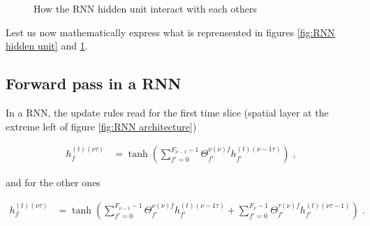 \begin{figure}[H]
\begin{center}
\caption{\label{fig:RNN interaction}How the RNN hidden unit interact with each others}
\end{center}
\end{figure}


Lest us now mathematically express what is reprensented in figures \ref{fig:RNN hidden unit} and \ref{fig:RNN interaction}.

\subsection{Forward pass in a RNN}

 In a RNN, the update rules read for the first time slice (spatial layer at the extreme left of figure \ref{fig:RNN architecture})
 
\begin{align}
h^{(t)(\nu\tau)}_f&=\tanh\left(\sum_{f'=0}^{F_{{\nu-1}}-1}\Theta^{\nu(\nu)f}_{f'}
%
h^{(t)(\nu-1\tau)}_{f'}\right)\;,
\end{align}

and for the other ones

\begin{align}
h^{(t)(\nu\tau)}_f&=\tanh\left(\sum_{f'=0}^{F_{{\nu-1}}-1}\Theta^{\nu(\nu)f}_{f'}
%
h^{(t)(\nu-1\tau)}_{f'}+\sum_{f'=0}^{F_{{\nu}}-1}\Theta^{\tau(\nu)f}_{f'}
%
h^{(t)(\nu\tau-1)}_{f'}\right)\;.
\end{align}

